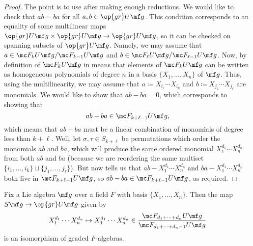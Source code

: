 \documentclass[../notes.tex]{subfiles}
\begin{document}
\begin{proof}
	The point is to use  after making enough reductions. We would like to check that $ab=ba$ for all $a,b\in\op{gr}U\mf g$. This condition corresponds to an equality of some multilinear maps $\op{gr}U\mf g\times\op{gr}U\mf g\to\op{gr}U\mf g$, so it can be checked on spanning subsets of $\op{gr}U\mf g$. Namely, we may assume that $a\in\mc F_kU\mf g/\mc F_{k-1}U\mf g$ and $b\in\mc F_\ell U\mf g/\mc F_{\ell-1}U\mf g$. Now, by definition of $\mc F_kU\mf g$ in  means that elements of $\mc F_kU\mf g$ can be written as homogeneous polynomials of degree $n$ in a basis $\{X_1,\ldots,X_n\}$ of $\mf g$. Thus, using the multilinearity, we may assume that $a\coloneqq X_{i_1}\cdots X_{i_k}$ and $b\coloneqq X_{j_1}\cdots X_{j_\ell}$ are monomials. We would like to show that $ab-ba=0$, which corresponds to showing that
	\[ab-ba\in\mc F_{k+\ell-1}U\mf g,\]
	which means that $ab-ba$ must be a linear combination of monomials of degree less than $k+\ell$. Well, let $\sigma,\tau\in S_{k+\ell}$ be permutations which order the monomials $ab$ and $ba$, which will produce the same ordered monomial $X_1^{d_1}\cdots X_n^{d_n}$ from both $ab$ and $ba$ (because we are reordering the same multiset $\{i_1,\ldots,i_k\}\sqcup\{j_1,\ldots,j_\ell\}$). But now  tells us that $ab-X_1^{d_1}\cdots X_n^{d_n}$ and $ba-X_1^{d_1}\cdots X_n^{d_n}$ both live in $\mc F_{k+\ell-1}U\mf g$, so $ab-ba\in\mc F_{k+\ell-1}U\mf g$, as required.
\end{proof}
\begin{proposition} \label{prop:gr-ug-is-sg}
	Fix a Lie algebra $\mf g$ over a field $F$ with basis $\{X_1,\ldots,X_n\}$. Then the map $S\mf g\to\op{gr}U\mf g$ given by
	\[X_1^{d_1}\cdots X_n^{d_n}\mapsto X_1^{d_1}\cdots X_n^{d_n}\in\frac{\mc F_{d_1+\cdots+d_n}U\mf g}{\mc F_{d_1+\cdots+d_n-1}U\mf g}\]
	is an isomorphism of graded $F$-algebras.
\end{proposition}
\end{document}
